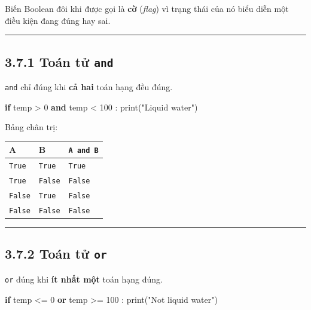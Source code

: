 \documentclass[
  11pt,
  a4paper,
]{article}
\newenvironment{Shaded}{}{}
\newcommand{\BuiltInTok}[1]{\textcolor[rgb]{0.00,0.50,0.00}{#1}}
\newcommand{\ControlFlowTok}[1]{\textcolor[rgb]{0.00,0.44,0.13}{\textbf{#1}}}
\newcommand{\DecValTok}[1]{\textcolor[rgb]{0.25,0.63,0.44}{#1}}
\newcommand{\KeywordTok}[1]{\textcolor[rgb]{0.00,0.44,0.13}{\textbf{#1}}}
\newcommand{\NormalTok}[1]{#1}
\newcommand{\OperatorTok}[1]{\textcolor[rgb]{0.40,0.40,0.40}{#1}}
\newcommand{\StringTok}[1]{\textcolor[rgb]{0.25,0.44,0.63}{#1}}
\begin{document}
Biến Boolean đôi khi được gọi là \textbf{cờ} (\emph{flag}) vì trạng thái
của nó biểu diễn một điều kiện đang đúng hay sai.

\begin{center}\rule{0.5\linewidth}{0.5pt}\end{center}

\subsection{\texorpdfstring{3.7.1 Toán tử
\texttt{and}}{3.7.1 Toán tử and}}\label{touxe1n-tux1eed-and}

\texttt{and} chỉ đúng khi \textbf{cả hai} toán hạng đều đúng.

\begin{Shaded}
\begin{Highlighting}[]
\ControlFlowTok{if}\NormalTok{ temp }\OperatorTok{\textgreater{}} \DecValTok{0} \KeywordTok{and}\NormalTok{ temp }\OperatorTok{\textless{}} \DecValTok{100}\NormalTok{ :}
    \BuiltInTok{print}\NormalTok{(}\StringTok{"Liquid water"}\NormalTok{)}
\end{Highlighting}
\end{Shaded}

Bảng chân trị:

\begin{longtable}[]{@{}lll@{}}
\toprule\noalign{}
A & B & \texttt{A\ and\ B} \\
\midrule\noalign{}
\endhead
\bottomrule\noalign{}
\endlastfoot
\texttt{True} & \texttt{True} & \texttt{True} \\
\texttt{True} & \texttt{False} & \texttt{False} \\
\texttt{False} & \texttt{True} & \texttt{False} \\
\texttt{False} & \texttt{False} & \texttt{False} \\
\end{longtable}

\begin{center}\rule{0.5\linewidth}{0.5pt}\end{center}

\subsection{\texorpdfstring{3.7.2 Toán tử
\texttt{or}}{3.7.2 Toán tử or}}\label{touxe1n-tux1eed-or}

\texttt{or} đúng khi \textbf{ít nhất một} toán hạng đúng.

\begin{Shaded}
\begin{Highlighting}[]
\ControlFlowTok{if}\NormalTok{ temp }\OperatorTok{\textless{}=} \DecValTok{0} \KeywordTok{or}\NormalTok{ temp }\OperatorTok{\textgreater{}=} \DecValTok{100}\NormalTok{ :}
    \BuiltInTok{print}\NormalTok{(}\StringTok{"Not liquid water"}\NormalTok{)}
\end{Highlighting}
\end{Shaded}
\end{document}

